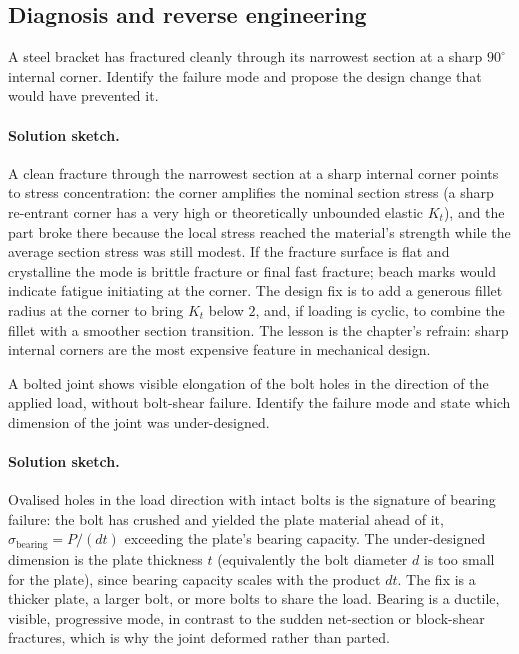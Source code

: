 \subsection*{Diagnosis and reverse engineering}

\begin{exercise}
A steel bracket has fractured cleanly through its narrowest section
at a sharp $90^{\circ}$ internal corner. Identify the failure mode
and propose the design change that would have prevented it.
\paragraph{Solution sketch.} A clean fracture through the narrowest
section at a sharp internal corner points to stress concentration:
the corner amplifies the nominal section stress (a sharp re-entrant
corner has a very high or theoretically unbounded elastic $K_t$), and
the part broke there because the local stress reached the material's
strength while the average section stress was still modest. If the
fracture surface is flat and crystalline the mode is brittle fracture
or final fast fracture; beach marks would indicate fatigue initiating
at the corner. The design fix is to add a generous fillet radius at the
corner to bring $K_t$ below $2$, and, if loading is cyclic, to combine
the fillet with a smoother section transition. The lesson is the
chapter's refrain: sharp internal corners are the most expensive
feature in mechanical design.
\end{exercise}

\begin{exercise}
A bolted joint shows visible elongation of the bolt holes in the
direction of the applied load, without bolt-shear failure. Identify
the failure mode and state which dimension of the joint was
under-designed.
\paragraph{Solution sketch.} Ovalised holes in the load direction with
intact bolts is the signature of bearing failure: the bolt has crushed
and yielded the plate material ahead of it, $\sigma_{\text{bearing}} =
P/(dt)$ exceeding the plate's bearing capacity. The under-designed
dimension is the plate thickness $t$ (equivalently the bolt diameter
$d$ is too small for the plate), since bearing capacity scales with the
product $dt$. The fix is a thicker plate, a larger bolt, or more bolts
to share the load. Bearing is a ductile, visible, progressive mode, in
contrast to the sudden net-section or block-shear fractures, which is
why the joint deformed rather than parted.
\end{exercise}

